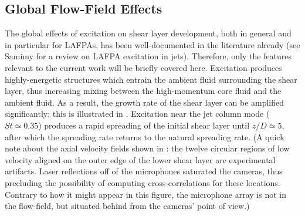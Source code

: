 \subsection{Global Flow-Field Effects}
The global effects of excitation on shear layer development, both in general and in particular for LAFPAs, has been well-documented in the literature already (see Samimy \etal \citep{Samimy2012} for a review on LAFPA excitation in jets).
Therefore, only the features relevant to the current work will be briefly covered here.
Excitation produces highly-energetic structures which entrain the ambient fluid surrounding the shear layer, thus increasing mixing between the high-momentum core fluid and the ambient fluid.
As a result, the growth rate of the shear layer can be amplified significantly; this is illustrated in .
Excitation near the jet column mode ($St \simeq 0.35$) produces a rapid spreading of the initial shear layer until $z/D \simeq 5$, after which the spreading rate returns to the natural spreading rate.
(A quick note about the axial velocity fields shown in : the twelve circular regions of low velocity aligned on the outer edge of the lower shear layer are experimental artifacts. Laser reflections off of the microphones saturated the cameras, thus precluding the possibility of computing cross-correlations for these locations. Contrary to how it might appear in this figure, the microphone array is not in the flow-field, but situated behind from the cameras' point of view.)
